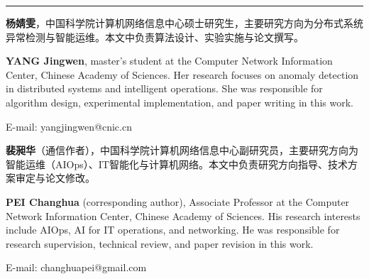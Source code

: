 \documentclass[10.5pt,a4paper,twocolumn]{ctexart}
\begin{document}
\vspace{1em}
\noindent\rule{\columnwidth}{0.4pt}
\vspace{0.5em}

{\small

\noindent\begin{minipage}{\columnwidth}
\begin{minipage}[t]{0.18\columnwidth}
    \vspace{0pt}
    
\end{minipage}\hfill
\begin{minipage}[t]{0.78\columnwidth}
    \vspace{0pt}
    \textbf{杨婧雯}，中国科学院计算机网络信息中心硕士研究生，主要研究方向为分布式系统异常检测与智能运维。本文中负责算法设计、实验实施与论文撰写。

    \textbf{YANG Jingwen}, master's student at the Computer Network Information Center, Chinese Academy of Sciences. Her research focuses on anomaly detection in distributed systems and intelligent operations. She was responsible for algorithm design, experimental implementation, and paper writing in this work.

    E-mail: yangjingwen@cnic.cn%
\end{minipage}
\end{minipage}

\vspace{1em}

\noindent\begin{minipage}{\columnwidth}
\begin{minipage}[t]{0.18\columnwidth}
    \vspace{0pt}
    
\end{minipage}\hfill
\begin{minipage}[t]{0.78\columnwidth}
    \vspace{0pt}
    \textbf{裴昶华}（通信作者），中国科学院计算机网络信息中心副研究员，主要研究方向为智能运维（AIOps）、IT智能化与计算机网络。本文中负责研究方向指导、技术方案审定与论文修改。

    \textbf{PEI Changhua} (corresponding author), Associate Professor at the Computer Network Information Center, Chinese Academy of Sciences. His research interests include AIOps, AI for IT operations, and networking. He was responsible for research supervision, technical review, and paper revision in this work.

    E-mail: changhuapei@gmail.com
\end{minipage}
\end{minipage}

}
\end{document}
